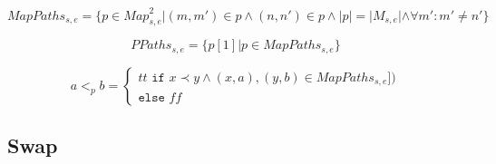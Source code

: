 \[MapPaths_{s,e} = \{p \in {Map}_{s,e}^2 | (m,m') \in p \land (n,n') \in p \land |p| = |M_{s,e}| \land  \forall m': m' \neq n' \}\]

\[ PPaths_{s,e} = \{p[1] | p \in MapPaths_{s,e}\}\]

\[a <_{p} b = 
\left\{\begin{matrix}
tt \texttt{ if } x \prec y \land (x, a), (y, b) \in MapPaths_{s,e}])\\
\texttt{else } ff
\end{matrix}\right.\]



\subsection{Swap}

